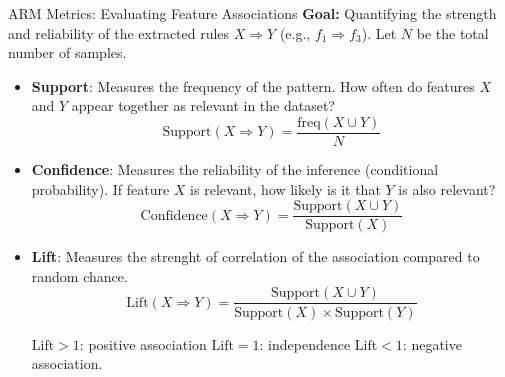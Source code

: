 \documentclass[10pt,aspectratio=169]{beamer}
\begin{document}
\begin{frame}{ARM Metrics: Evaluating Feature Associations}
  \textbf{Goal:} Quantifying the strength and reliability of the extracted rules $X \Rightarrow Y$ (e.g., $f_1 \Rightarrow f_3$). Let $N$ be the total number of samples.
  \vspace{10pt}

  \begin{itemize}\small
    \item \textbf{Support}: Measures the frequency of the pattern. How often do features $X$ and $Y$ appear together as relevant in the dataset?
    $$ \text{Support}(X \Rightarrow Y) = \frac{\text{freq}(X \cup Y)}{N} $$
    \vspace{2pt}

    \item \textbf{Confidence}: Measures the reliability of the inference (conditional probability). If feature $X$ is relevant, how likely is it that $Y$ is also relevant?
    $$ \text{Confidence}(X \Rightarrow Y) = \frac{\text{Support}(X \cup Y)}{\text{Support}(X)} $$
    \vspace{2pt}

    \item \textbf{Lift}: Measures the strenght of correlation of the association compared to random chance.
    $$ \text{Lift}(X \Rightarrow Y) = \frac{\text{Support}(X \cup Y)}{\text{Support}(X) \times \text{Support}(Y)} $$
    
    \vspace{4pt}
    {\footnotesize
    $\text{Lift} > 1$: positive association \hfill
    $\text{Lift} = 1$: independence \hfill
    $\text{Lift} < 1$: negative association.
    }
  \end{itemize}
\end{frame}
\end{document}

